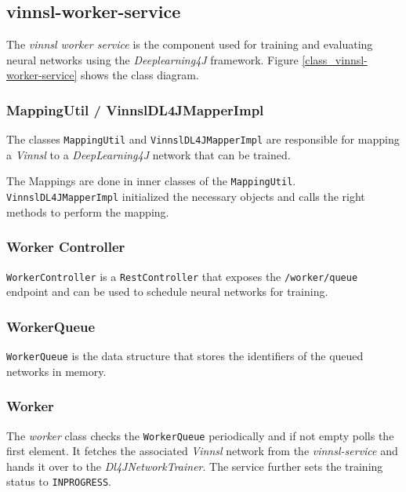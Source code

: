 \subsection{vinnsl-worker-service}\label{vinnsl-worker-service}

The \emph{vinnsl worker service} is the component used for training and
evaluating neural networks using the \emph{Deeplearning4J} framework.
Figure \ref{class_vinnsl-worker-service} shows the class diagram.

\subsubsection{MappingUtil /
VinnslDL4JMapperImpl}\label{mappingutil-vinnsldl4jmapperimpl}

The classes \texttt{MappingUtil} and \texttt{VinnslDL4JMapperImpl} are
responsible for mapping a \emph{Vinnsl} to a \emph{DeepLearning4J}
network that can be trained.

The Mappings are done in inner classes of the \texttt{MappingUtil}.
\texttt{VinnslDL4JMapperImpl} initialized the necessary objects and
calls the right methods to perform the mapping.

\subsubsection{Worker Controller}\label{worker-controller}

\texttt{WorkerController} is a \texttt{RestController} that exposes the
\texttt{/worker/queue} endpoint and can be used to schedule neural
networks for training.

\subsubsection{WorkerQueue}\label{workerqueue}

\texttt{WorkerQueue} is the data structure that stores the identifiers
of the queued networks in memory.

\subsubsection{Worker}\label{worker}

The \emph{worker} class checks the \texttt{WorkerQueue} periodically and
if not empty polls the first element. It fetches the associated
\emph{Vinnsl} network from the \emph{vinnsl-service} and hands it over
to the \emph{Dl4JNetworkTrainer}. The service further sets the training
status to \texttt{INPROGRESS}.

